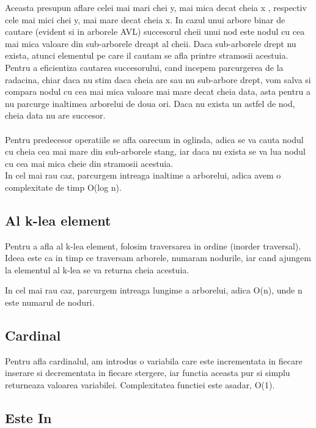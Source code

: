 \documentclass[12pt]{article}
\begin{document}
Aceasta presupun aflare celei mai mari chei y, mai mica decat cheia x , respectiv cele mai mici chei y, mai mare decat cheia x.
In cazul unui arbore binar de cautare (evident si in arborele AVL) succesorul cheii unui nod este nodul cu cea mai mica valoare din sub-arborele dreapt al cheii.
Daca sub-arborele drept nu exista, atunci elementul pe care il cautam se afla printre stramosii acestuia. Pentru a eficientiza cautarea succesorului, cand incepem parcurgerea de la radacina, chiar daca nu stim daca cheia are sau nu sub-arbore drept, vom salva si compara nodul cu cea mai mica valoare mai mare decat cheia data, asta pentru a nu parcurge inaltimea arborelui de doua ori. Daca nu exista un astfel de nod, cheia data nu are succesor.\\\\
Pentru predecesor operatiile se afla oarecum in oglinda, adica se va cauta nodul cu cheia cea mai mare din sub-arborele stang, iar daca nu exista se va lua nodul cu cea mai mica cheie din stramosii acestuia.
\\

In cel mai rau caz, parcurgem intreaga inaltime a arborelui, adica avem o complexitate de timp O(log n).


\subsection{Al k-lea element}

Pentru a afla al k-lea element, folosim traversarea in ordine (inorder traversal). Ideea este ca in timp ce traversam arborele, numaram nodurile, iar cand ajungem la elementul al k-lea se va returna cheia acestuia.

In cel mai rau caz, parcurgem intreaga lungime a arborelui, adica O(n), unde n este numarul de noduri.

\subsection{Cardinal }

Pentru afla cardinalul, am introdus o variabila care este incrementata in fiecare inserare si decrementata in fiecare stergere, iar functia aceasta pur si simplu returneaza valoarea variabilei.
Complexitatea functiei este asadar, O(1).

\subsection{Este In}
\end{document}
